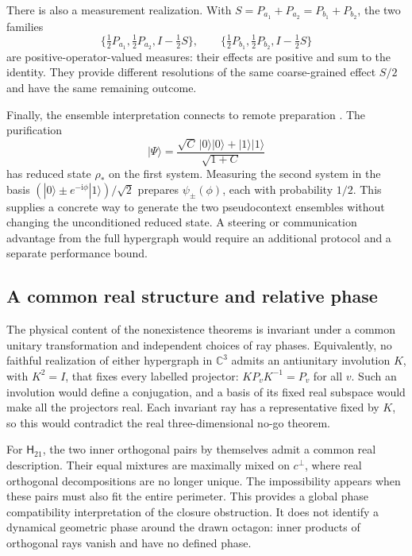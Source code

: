 \documentclass[twocolumn,aps,pra,floatfix,amsmath,amssymb,longbibliography]{revtex4-2}
\theoremstyle{definition}
\theoremstyle{remark}
\newcommand{\ii}{\mathrm{i}}
\newcommand{\C}{\mathbb C}
\newcommand{\Htwentyone}{\mathsf H_{21}}
\begin{document}
There is also a measurement realization.  With
$S=P_{a_1}+P_{a_2}=P_{b_1}+P_{b_2}$, the two families
\[
 \{\tfrac12P_{a_1},\tfrac12P_{a_2},I-\tfrac12S\},\qquad
 \{\tfrac12P_{b_1},\tfrac12P_{b_2},I-\tfrac12S\}
\]
are positive-operator-valued measures: their effects are positive and sum
to the identity.  They provide different resolutions of the same
coarse-grained effect $S/2$ and have the same remaining outcome.

Finally, the ensemble interpretation connects to remote preparation
\cite{Hughston-Jozsa-Wootters-1993}.  The purification
\[
 |\Psi\rangle=
 \frac{\sqrt C\,|0\rangle|0\rangle+|1\rangle|1\rangle}{\sqrt{1+C}}
\]
has reduced state $\rho_*$ on the first system.  Measuring the second
system in the basis
$(|0\rangle\pm e^{-\ii\phi}|1\rangle)/\sqrt2$ prepares
$\psi_\pm(\phi)$, each with probability $1/2$.  This supplies a concrete
way to generate the two pseudocontext ensembles without changing the
unconditioned reduced state.  A steering or communication advantage from
the full hypergraph would require an additional protocol and a separate
performance bound.

\subsection{A common real structure and relative phase}

The physical content of the nonexistence theorems is invariant under a
common unitary transformation and independent choices of ray phases.
Equivalently, no faithful realization of either hypergraph in $\C^3$ admits
an antiunitary involution $K$, with $K^2=I$, that fixes every labelled
projector: $KP_vK^{-1}=P_v$ for all $v$.  Such an involution would define
a conjugation, and a basis of its fixed real subspace would make all the
projectors real.  Each invariant ray has a representative fixed by $K$,
so this would contradict the real three-dimensional no-go theorem.

For $\Htwentyone$, the two inner orthogonal pairs by themselves admit a
common real description.  Their equal mixtures are maximally mixed on
$c^\perp$, where real orthogonal decompositions are no longer unique.
The impossibility appears when these pairs must also fit the entire
perimeter.  This provides a global phase compatibility interpretation of
the closure obstruction.  It does not identify a dynamical geometric phase
around the drawn octagon: inner products of orthogonal rays vanish and
have no defined phase.
\end{document}
